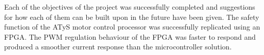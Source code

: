Each of the objectives of the project was successfully completed and suggestions for how each of them can be built upon in the future have been given. The safety function of the ATyS motor control processor was successfully replicated using an FPGA. The PWM regulation behaviour of the FPGA was faster to respond and produced a smoother current response than the microcontroller solution.